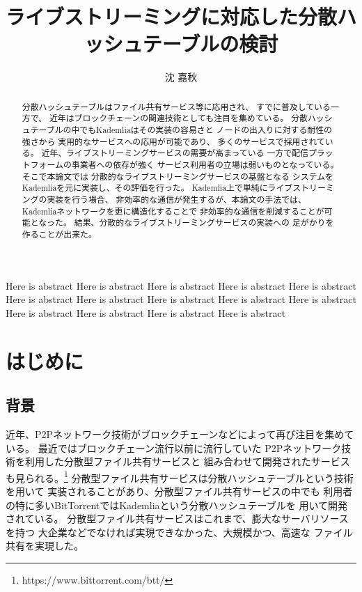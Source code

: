 \documentclass[sotsuron]{jcsie}
\title{ライブストリーミングに対応した分散ハッシュテーブルの検討}
\author{沈 嘉秋}
\begin{document}
\maketitle
\emaketitle
{}
\begin{abstract}    
  分散ハッシュテーブルはファイル共有サービス等に応用され、
  すでに普及している一方で、
  近年はブロックチェーンの関連技術としても注目を集めている。
  分散ハッシュテーブルの中でもKademliaはその実装の容易さと
  ノードの出入りに対する耐性の強さから
  実用的なサービスへの応用が可能であり、
  多くのサービスで採用されている。
  近年、ライブストリーミングサービスの需要が高まっている
  一方で配信プラットフォームの事業者への依存が強く
  サービス利用者の立場は弱いものとなっている。
  そこで本論文では
  分散的なライブストリーミングサービスの基盤となる
  システムをKademliaを元に実装し、その評価を行った。
  Kademlia上で単純にライブストリーミングの実装を行う場合、
  非効率的な通信が発生するが、本論文の手法では、
  Kademliaネットワークを更に構造化することで
  非効率的な通信を削減することが可能となった。
  結果、分散的なライブストリーミングサービスの実装への
  足がかりを作ることが出来た。
\end{abstract}
\begin{eabstract}
  Here is abstract
  Here is abstract
  Here is abstract
  Here is abstract
  Here is abstract
  Here is abstract
  Here is abstract
  Here is abstract
  Here is abstract
  Here is abstract
  Here is abstract
  Here is abstract
  Here is abstract
  Here is abstract
\end{eabstract}
\tableofcontents
{}
\chapter{はじめに}
\section{背景}
近年、P2Pネットワーク技術がブロックチェーンなどによって再び注目を集めている。
最近ではブロックチェーン流行以前に流行していた
P2Pネットワーク技術を利用した分散型ファイル共有サービスと
組み合わせて開発されたサービスも見られる。\footnote{https://www.bittorrent.com/btt/}
分散型ファイル共有サービスは分散ハッシュテーブルという技術を用いて
実装されることがあり、分散型ファイル共有サービスの中でも
利用者の特に多いBitTorrentではKademliaという分散ハッシュテーブルを
用いて開発されている。
分散型ファイル共有サービスはこれまで、膨大なサーバリソースを持つ
大企業などでなければ実現できなかった、大規模かつ、高速な
ファイル共有を実現した。
\end{document}
